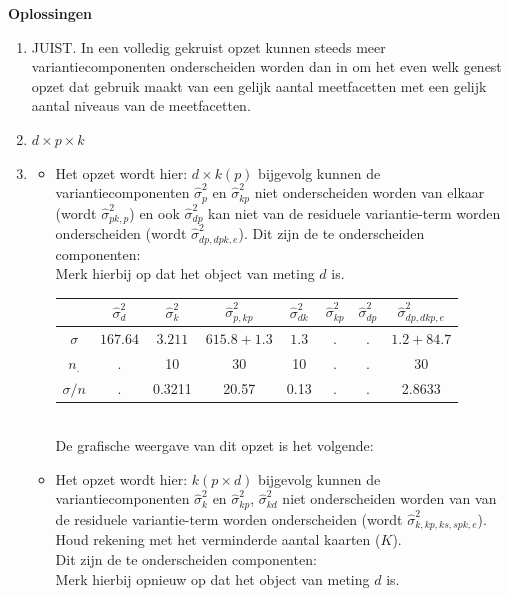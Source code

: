 \OPLOSSING
{
\textbf{Oplossingen}
\begin{enumerate}
\item JUIST. In een volledig gekruist opzet kunnen steeds meer variantiecomponenten onderscheiden worden dan in om het even welk genest opzet dat gebruik maakt van een gelijk aantal meetfacetten met een gelijk aantal niveaus van de meetfacetten. 
\item $d \times p \times k$

\item
\begin{itemize}
	\item Het opzet wordt hier: $d \times k\left(p\right)$ bijgevolg kunnen de variantiecomponenten $\hat{\sigma}^2_p$ en $\hat{\sigma}^2_{kp}$ niet onderscheiden worden van elkaar (wordt $\hat{\sigma}^2_{pk,p}$) en ook $\hat{\sigma}^2_{dp}$ kan niet van de residuele variantie-term worden onderscheiden (wordt $\hat{\sigma}^2_{dp, dpk,e}$). Dit zijn de te onderscheiden componenten:\\ Merk hierbij op dat het object van meting $d$ is. \\
	\begin{tabular}{|c|c|c|c|c|c|c|c|} \hline
	 & $ \hat{\sigma}^2_{d}$ & $ \hat{\sigma}^2_{k} $& $ \hat{\sigma}^2_{p,kp} $ & $ \hat{\sigma}^2_{dk}$ & $\hat{\sigma}^2_{kp} $ & $ \hat{\sigma}^2_{dp} $& $ \hat{\sigma}^2_{dp, dkp, e} $ \\ \hline
	$\sigma$  			& $ 167.64 $ 			& $ 3.211 $ 			& $615.8+1.3  $ 			& $ 1.3 $				 & $. $	& $ . $& $ 1.2 + 84.7  $ \\
	$n_.$				& .						& 10					& 30				 		& 10			  		 & $. $	& $ . $&  30 \\ \hline
	$\sigma / n$ 		& .						& 0.3211				& 20.57				 		& 0.13			  	 & $. $	& $ . $&  2.8633 \\ \hline
	\end{tabular} \\
	De grafische weergave van dit opzet is het volgende:\\
	
	
	\item Het opzet wordt hier: $k\left(p\times d\right)$ bijgevolg kunnen de variantiecomponenten $\hat{\sigma}^2_k$ en $\hat{\sigma}^2_{kp}$, $\hat{\sigma}^2_{kd}$ niet onderscheiden worden van  van de residuele variantie-term worden onderscheiden (wordt $\hat{\sigma}^2_{k, kp, ks, spk, e}$). Houd rekening met het verminderde aantal kaarten ($K$).\\Dit zijn de te onderscheiden componenten:\\ Merk hierbij opnieuw op dat het object van meting $d$ is. \\


\end{itemize}
\end{enumerate}}
